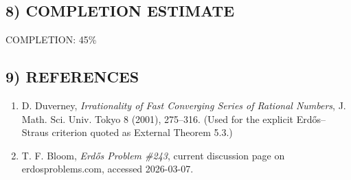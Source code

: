\subsection*{8) COMPLETION ESTIMATE}
COMPLETION: 45\%

\subsection*{9) REFERENCES}
\begin{enumerate}
\item D. Duverney, \emph{Irrationality of Fast Converging Series of Rational Numbers}, J. Math. Sci. Univ. Tokyo 8 (2001), 275--316. (Used for the explicit Erd\H{o}s--Straus criterion quoted as External Theorem 5.3.)
\item T. F. Bloom, \emph{Erd\H{o}s Problem \#243}, current discussion page on erdosproblems.com, accessed 2026-03-07.
\end{enumerate}

